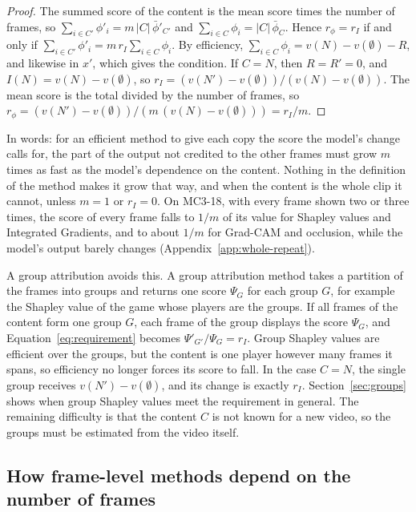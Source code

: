 \begin{proof}
The summed score of the content is the mean score times the number of frames, so $\sum_{i \in C'} \phi'_i = m\,|C|\,\bar\phi'_{C'}$ and $\sum_{i \in C} \phi_i = |C|\,\bar\phi_C$.
Hence $r_\phi = r_I$ if and only if $\sum_{i \in C'} \phi'_i = m\, r_I \sum_{i \in C} \phi_i$.
By efficiency, $\sum_{i \in C} \phi_i = v(N) - v(\emptyset) - R$, and likewise in $x'$, which gives the condition.
If $C = N$, then $R = R' = 0$, and $I(N) = v(N) - v(\emptyset)$, so $r_I = (v(N') - v(\emptyset)) / (v(N) - v(\emptyset))$.
The mean score is the total divided by the number of frames, so $r_\phi = (v(N') - v(\emptyset)) / (m\,(v(N) - v(\emptyset))) = r_I / m$.
\end{proof}

In words: for an efficient method to give each copy the score the model's change calls for, the part of the output not credited to the other frames must grow $m$ times as fast as the model's dependence on the content.
Nothing in the definition of the method makes it grow that way, and when the content is the whole clip it cannot, unless $m = 1$ or $r_I = 0$.
On MC3-18, with every frame shown two or three times, the score of every frame falls to $1/m$ of its value for Shapley values and Integrated Gradients, and to about $1/m$ for Grad-CAM and occlusion, while the model's output barely changes (Appendix~\ref{app:whole-repeat}).

A group attribution avoids this.
A group attribution method takes a partition of the frames into groups and returns one score $\Psi_G$ for each group $G$, for example the Shapley value of the game whose players are the groups.
If all frames of the content form one group $G$, each frame of the group displays the score $\Psi_G$, and Equation~\ref{eq:requirement} becomes $\Psi'_{G'} / \Psi_G = r_I$.
Group Shapley values are efficient over the groups, but the content is one player however many frames it spans, so efficiency no longer forces its score to fall.
In the case $C = N$, the single group receives $v(N') - v(\emptyset)$, and its change is exactly $r_I$.
Section~\ref{sec:groups} shows when group Shapley values meet the requirement in general.
The remaining difficulty is that the content $C$ is not known for a new video, so the groups must be estimated from the video itself.

\subsection{How frame-level methods depend on the number of frames}
\label{sec:why}

